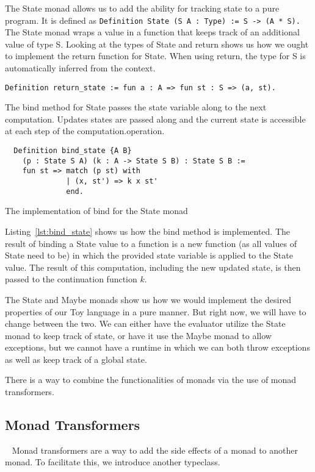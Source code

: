 The State monad allows us to add the ability for tracking state to a pure
program. It is defined as 
\texttt{Definition State (S A : Type) := S -> (A * S). } The State
monad wraps a value in a function that keeps track of an additional value of
type S. Looking at the types of State and return shows us how we ought to
implement the return function for State. When using return, the type for S 
is automatically inferred from the context.

\begin{listing}[H]
\begin{verbatim}
Definition return_state := fun a : A => fun st : S => (a, st).
\end{verbatim}
\end{listing}

The bind method for State passes the state variable along to the next
computation. Updates states are passed along and the current state is
accessible at each step of the computation.operation.

\begin{listing}[H]
\begin{verbatim}
  Definition bind_state {A B} 
    (p : State S A) (k : A -> State S B) : State S B :=
    fun st => match (p st) with
              | (x, st') => k x st'
              end.
\end{verbatim}
\caption{The implementation of bind for the State monad}
\label{lst:bind_state}
\end{listing}

Listing~\ref{lst:bind_state} shows us how the bind method is implemented. The
result of binding a State value to a function is a new function (as all values
of State need to be) in which the provided state variable is applied to the
State value. The result of this computation, including the new updated state,
is then passed to the continuation function $k$.

The State and Maybe monads show us how we would implement the desired
properties of our Toy language in a pure manner. But right now, we will have to
change between the two. We can either have the evaluator utilize the State
monad to keep track of state, or have it use the Maybe monad to allow
exceptions, but we cannot have a runtime in which we can both throw exceptions
as well as keep track of a global state. 

There is a way to combine the functionalities of monads via the use of monad
transformers. 

\subsection{Monad Transformers}~\label{sec:monad_transformers}
Monad transformers are a way to add the side effects of a monad to another
monad. To facilitate this, we introduce another typeclass.

